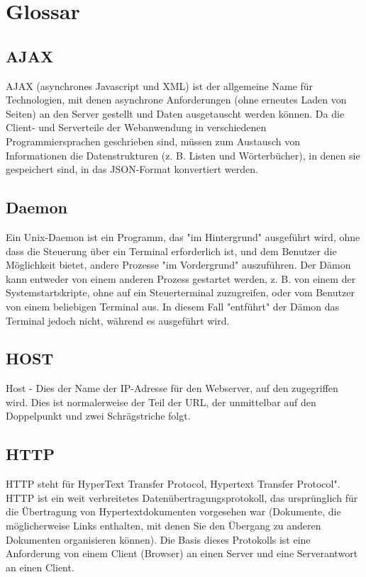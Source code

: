 \clearpage
{}
\chapter*{Glossar}
%
\section*{AJAX}
\label{sec:appendix:ajax}
AJAX (asynchrones Javascript und XML) ist der allgemeine Name für Technologien, mit denen asynchrone Anforderungen (ohne erneutes Laden von Seiten) an den Server gestellt und Daten ausgetauscht werden können. Da die Client- und Serverteile der Webanwendung in verschiedenen Programmiersprachen geschrieben sind, müssen zum Austausch von Informationen die Datenstrukturen (z. B. Listen und Wörterbücher), in denen sie gespeichert sind, in das JSON-Format konvertiert werden.

\section*{Daemon}
\label{sec:appendix:daemon}
Ein Unix-Daemon ist ein Programm, das "im Hintergrund" ausgeführt wird, ohne dass die Steuerung über ein Terminal erforderlich ist, und dem Benutzer die Möglichkeit bietet, andere Prozesse "im Vordergrund" auszuführen. Der Dämon kann entweder von einem anderen Prozess gestartet werden, z. B. von einem der Systemstartskripte, ohne auf ein Steuerterminal zuzugreifen, oder vom Benutzer von einem beliebigen Terminal aus. In diesem Fall "entführt" der Dämon das Terminal jedoch nicht, während es ausgeführt wird.

\section*{HOST}
\label{sec:appendix:host}
Host - Dies  der Name der IP-Adresse für den Webserver, auf den zugegriffen wird. Dies ist normalerweise der Teil der URL, der unmittelbar auf den Doppelpunkt und zwei Schrägstriche folgt.

\section*{HTTP}
\label{sec:appendix:http}
HTTP steht für HyperText Transfer Protocol, Hypertext Transfer Protocol". HTTP ist ein weit verbreitetes Datenübertragungsprotokoll, das ursprünglich für die Übertragung von Hypertextdokumenten vorgesehen war (Dokumente, die möglicherweise Links enthalten, mit denen Sie den Übergang zu anderen Dokumenten organisieren können). Die Basis dieses Protokolls ist eine Anforderung von einem Client (Browser) an einen Server und eine Serverantwort an einen Client.

